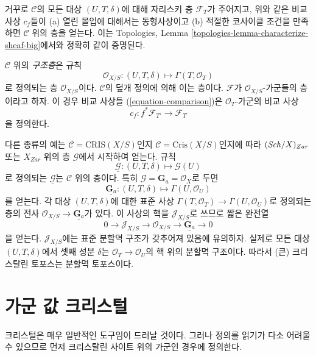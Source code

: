 \medskip\noindent
거꾸로 $\mathcal{C}$의 모든 대상 $(U, T, \delta)$에 대해 자리스키
층 $\mathcal{F}_T$가 주어지고, 위와 같은 비교 사상 $c_f$들이
(a) 열린 몰입에 대해서는 동형사상이고 (b) 적절한 코사이클 조건을
만족하면 $\mathcal{C}$ 위의 층을 얻는다. 이는 Topologies,
Lemma \ref{topologies-lemma-characterize-sheaf-big}에서와 정확히
같이 증명된다.

\medskip\noindent
$\mathcal{C}$ 위의 {\it 구조층}은 규칙
$$
\mathcal{O}_{X/S} :
(U, T, \delta)
\longmapsto
\Gamma(T, \mathcal{O}_T)
$$
로 정의되는 층 $\mathcal{O}_{X/S}$이다. $\mathcal{C}$의 덮개 정의에
의해 이는 층이다. $\mathcal{F}$가 $\mathcal{O}_{X/S}$-가군들의
층이라고 하자. 이 경우 비교 사상들 (\ref{equation-comparison})은
$\mathcal{O}_T$-가군의 비교 사상
\begin{equation}
\label{equation-comparison-modules}
c_f : f^*\mathcal{F}_{T'} \longrightarrow \mathcal{F}_T
\end{equation}
을 정의한다.

\medskip\noindent
다른 종류의 예는 $\mathcal{C} = \text{CRIS}(X/S)$인지
$\mathcal{C} = \text{Cris}(X/S)$인지에 따라 $(\mathit{Sch}/X)_{Zar}$ 또는
$X_{Zar}$ 위의 층 $\mathcal{G}$에서 시작하여 얻는다.
규칙
$$
\underline{\mathcal{G}} :
(U, T, \delta)
\longmapsto
\mathcal{G}(U)
$$
로 정의되는 $\underline{\mathcal{G}}$는 $\mathcal{C}$ 위의 층이다.
특히 $\mathcal{G} = \mathbf{G}_a = \mathcal{O}_X$로 두면
$$
\underline{\mathbf{G}_a} :
(U, T, \delta)
\longmapsto
\Gamma(U, \mathcal{O}_U)
$$
를 얻는다. 각 대상 $(U, T, \delta)$에 대한 표준 사상
$\Gamma(T, \mathcal{O}_T) \to \Gamma(U, \mathcal{O}_U)$로 정의되는
층의 전사 $\mathcal{O}_{X/S} \to \underline{\mathbf{G}_a}$가 있다.
이 사상의 핵을 $\mathcal{J}_{X/S}$로 쓰므로 짧은 완전열
$$
0 \to
\mathcal{J}_{X/S} \to
\mathcal{O}_{X/S} \to
\underline{\mathbf{G}_a} \to 0
$$
을 얻는다. $\mathcal{J}_{X/S}$에는 표준 분할멱 구조가 갖추어져
있음에 유의하자. 실제로 모든 대상 $(U, T, \delta)$에서 셋째 성분
$\delta$는 $\mathcal{O}_T \to \mathcal{O}_U$의 핵 위의 분할멱
구조이다. 따라서 (큰) 크리스탈린 토포스는 분할멱 토포스이다.




\section{가군 값 크리스털}
\label{section-crystals}

\noindent
크리스털은 매우 일반적인 도구임이 드러날 것이다. 그러나 정의를
읽기가 다소 어려울 수 있으므로 먼저 크리스탈린 사이트 위의
가군인 경우에 정의한다.

